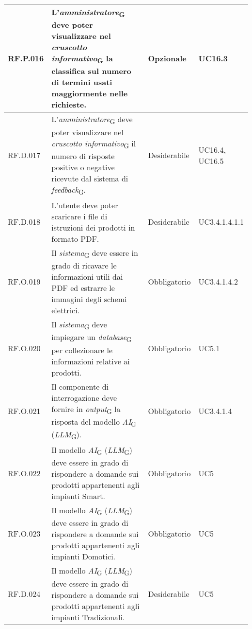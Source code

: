 \begin{table}[H]
\centering
    \begin{tabular}{|C{2.7cm}|L{6.5cm}|C{2.7cm}|C{2.7cm}|}
        \hline
        RF.P.016 & L'\textit{amministratore}\textsubscript{G} deve poter visualizzare nel \textit{cruscotto informativo}\textsubscript{G} la classifica sul numero di termini usati maggiormente nelle richieste.
         & Opzionale & UC16.3 \\
        \hline
        RF.D.017 & L'\textit{amministratore}\textsubscript{G} deve poter visualizzare nel \textit{cruscotto informativo}\textsubscript{G} il numero di risposte positive o negative ricevute dal sistema di \textit{feedback}\textsubscript{G}.
         & Desiderabile & UC16.4, UC16.5 \\
        \hline
         RF.D.018 & L'utente deve poter scaricare i file di istruzioni dei prodotti in formato PDF.
         & Desiderabile & UC3.4.1.4.1.1 \\
        \hline
         RF.O.019 & Il \textit{sistema}\textsubscript{G} deve essere in grado di ricavare le informazioni utili dai PDF ed estrarre le immagini degli schemi elettrici.
         & Obbligatorio & UC3.4.1.4.2 \\
        \hline
         RF.O.020 & Il \textit{sistema}\textsubscript{G} deve impiegare un \textit{database}\textsubscript{G} per collezionare le informazioni relative ai prodotti.
         & Obbligatorio & UC5.1 \\
        \hline
        RF.O.021 & Il componente di interrogazione deve fornire in \textit{output}\textsubscript{G} la risposta del modello \textit{AI}\textsubscript{G} (\textit{LLM}\textsubscript{G}).
         & Obbligatorio & UC3.4.1.4 \\
        \hline
        RF.O.022 & Il modello \textit{AI}\textsubscript{G} (\textit{LLM}\textsubscript{G}) deve essere in grado di rispondere a domande sui prodotti appartenenti agli impianti Smart.
         & Obbligatorio & UC5 \\
        \hline
        RF.O.023 & Il modello \textit{AI}\textsubscript{G} (\textit{LLM}\textsubscript{G}) deve essere in grado di rispondere a domande sui prodotti appartenenti agli impianti Domotici.
         & Obbligatorio & UC5 \\
         \hline
        RF.D.024 & Il modello \textit{AI}\textsubscript{G} (\textit{LLM}\textsubscript{G}) deve essere in grado di rispondere a domande sui prodotti appartenenti agli impianti Tradizionali.
         & Desiderabile & UC5 \\

\end{tabular}
\end{table}
